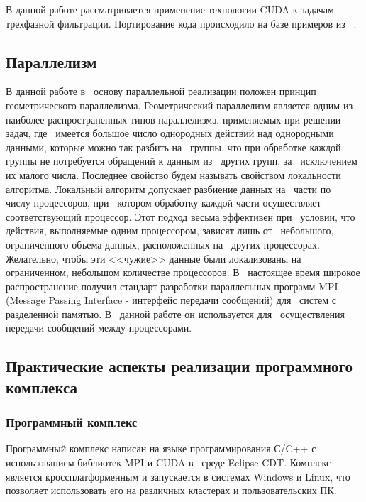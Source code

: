 В данной работе рассматривается применение технологии CUDA к задачам 
трехфазной фильтрации. Портирование кода происходило на базе
примеров из ~\cite{Sanders-CUDA}.

\subsection{Параллелизм}

В данной работе в~ основу параллельной реализации положен принцип геометрического параллелизма.
Геометрический параллелизм является одним из~ наиболее распространенных типов
параллелизма, применяемых при решении задач, где~ имеется большое число
однородных действий над однородными данными, которые можно так разбить на~
группы, что при обработке каждой группы не потребуется обращений к данным из~
других групп, за~ исключением их малого числа.
Последнее свойство будем называть свойством локальности алгоритма. Локальный
алгоритм допускает разбиение данных на~ части по~ числу процессоров, при~ котором
обработку каждой части осуществляет соответствующий процессор. Этот подход
весьма эффективен при~ условии, что действия, выполняемые одним процессором,
зависят лишь от~ небольшого, ограниченного объема данных, расположенных на~ других
процессорах. Желательно, чтобы эти <<чужие>> данные были локализованы на~
ограниченном, небольшом количестве процессоров.
В~ настоящее время широкое распространение получил стандарт разработки
параллельных программ MPI (Message Passing Interface - интерфейс передачи
сообщений) для~ систем с разделенной памятью. 
В~ данной работе он используется для~ осуществления передачи
сообщений между процессорами.

\subsection{Практические аспекты реализации программного комплекса}

\subsubsection{Программный комплекс}
Программный комплекс написан на языке
программирования С/C++ с использованием
библиотек MPI и CUDA в~ среде Eclipse CDT. Комплекс является
кроссплатформенным и запускается в системах Windows и Linux, что
позволяет использовать его на различных кластерах и пользовательских ПК.

